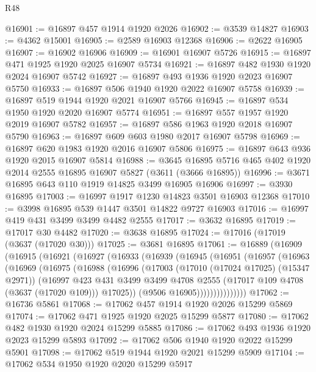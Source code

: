 \begin{lexlean}{R48}
\begin{coremodule}
@16901 := @16897 @457 @1914 @1920 @2026
@16902 := @3539 @14827
@16903 := @4362 @15001
@16905 := @2589 @16903 @12368
@16906 := @2622 @16905
@16907 := @16902 @16906
@16909 := @16901 @16907 @5726
@16915 := @16897 @471 @1925 @1920 @2025 @16907 @5734
@16921 := @16897 @482 @1930 @1920 @2024 @16907 @5742
@16927 := @16897 @493 @1936 @1920 @2023 @16907 @5750
@16933 := @16897 @506 @1940 @1920 @2022 @16907 @5758
@16939 := @16897 @519 @1944 @1920 @2021 @16907 @5766
@16945 := @16897 @534 @1950 @1920 @2020 @16907 @5774
@16951 := @16897 @557 @1957 @1920 @2019 @16907 @5782
@16957 := @16897 @586 @1963 @1920 @2018 @16907 @5790
@16963 := @16897 @609 @603 @1980 @2017 @16907 @5798
@16969 := @16897 @620 @1983 @1920 @2016 @16907 @5806
@16975 := @16897 @643 @936 @1920 @2015 @16907 @5814
@16988 := @3645 @16895 @5716 @465 @402 @1920 @2014 @2555 @16895 @16907 @5827 (@3611 (@3666 @16895))
@16996 := @3671 @16895 @643 @110 @1919 @14825 @3499 @16905 @16906
@16997 := @3930 @16895
@17003 := @16997 @1917 @1230 @14823 @3501 @16903 @12368
@17010 := @3998 @16895 @539 @1447 @3501 @14822 @9727 @16903
@17016 := @16997 @419 @431 @3499 @3499 @4482 @2555
@17017 := @3632 @16895
@17019 := @17017 @30 @4482
@17020 := @3638 @16895
@17024 := @17016 (@17019 (@3637 (@17020 @30)))
@17025 := @3681 @16895
@17061 := @16889
    (@16909
      (@16915
        (@16921
          (@16927
            (@16933
              (@16939
                (@16945
                  (@16951
                    (@16957
                      (@16963
                        (@16969
                          (@16975
                            (@16988
                              (@16996
                                (@17003
                                  (@17010 (@17024 @17025) (@15347 @2971))
                                  (@16997
                                    @423
                                    @431
                                    @3499
                                    @3499
                                    @4708
                                    @2555
                                    (@17017 @109 @4708 (@3637 (@17020 @109)))
                                    @17025))
                                (@9506 @16905)))))))))))))))
@17062 := @16736 @5861
@17068 := @17062 @457 @1914 @1920 @2026 @15299 @5869
@17074 := @17062 @471 @1925 @1920 @2025 @15299 @5877
@17080 := @17062 @482 @1930 @1920 @2024 @15299 @5885
@17086 := @17062 @493 @1936 @1920 @2023 @15299 @5893
@17092 := @17062 @506 @1940 @1920 @2022 @15299 @5901
@17098 := @17062 @519 @1944 @1920 @2021 @15299 @5909
@17104 := @17062 @534 @1950 @1920 @2020 @15299 @5917

\end{coremodule}
\end{lexlean}
